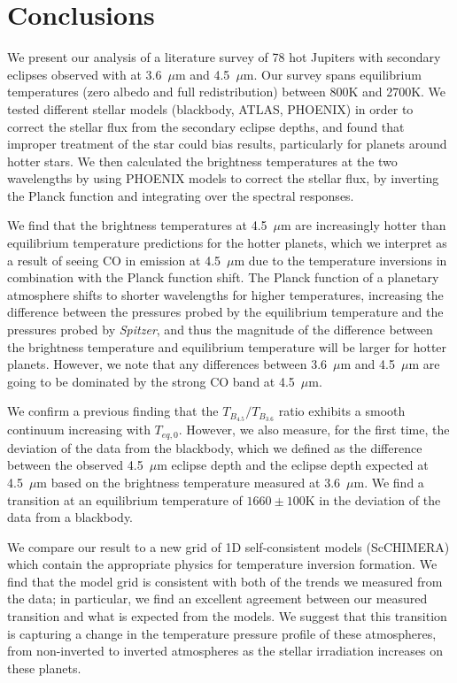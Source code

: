 
\section{Conclusions}

We present our analysis of a literature survey of 78 hot Jupiters with secondary eclipses observed with \spitzer at 3.6~$\mu$m and 4.5~$\mu$m. Our survey spans equilibrium temperatures (zero albedo and full redistribution) between 800K and 2700K. We tested different stellar models (blackbody, ATLAS, PHOENIX) in order to correct the stellar flux from the secondary eclipse depths, and found that improper treatment of the star could bias results, particularly for planets around hotter stars. We then calculated the brightness temperatures at the two \spitzer wavelengths by using PHOENIX models to correct the stellar flux, by inverting the Planck function and integrating over the \spitzer spectral responses.

We find that the brightness temperatures at 4.5~$\mu$m are increasingly hotter than equilibrium temperature predictions for the hotter planets, which we interpret as a result of seeing CO in emission at 4.5~$\mu$m due to the temperature inversions in combination with the Planck function shift. The Planck function of a planetary atmosphere shifts to shorter wavelengths for higher temperatures, increasing the difference between the pressures probed by the equilibrium temperature and the pressures probed by \textit{Spitzer}, and thus the magnitude of the difference between the brightness temperature and equilibrium temperature will be larger for hotter planets. However, we note that any differences between 3.6~$\mu$m and 4.5~$\mu$m are going to be dominated by the strong CO band at 4.5~$\mu$m.

We confirm a previous finding that the $T_{B_{4.5}}/T_{B_{3.6}}$ ratio exhibits a smooth continuum increasing with $T_{eq,\textit{0}}$.
However, we also measure, for the first time, the deviation of the data from the blackbody, which we defined as the difference between the observed 4.5~$\mu$m eclipse depth and the eclipse depth expected at 4.5~$\mu$m based on the brightness temperature measured at 3.6~$\mu$m. We find a transition at an equilibrium temperature of $1660\pm100$K in the deviation of the data from a blackbody.

We compare our result to a new grid of 1D self-consistent models (ScCHIMERA) which contain the appropriate physics for temperature inversion formation. We find that the model grid is consistent with both of the trends we measured from the data; in particular, we find an excellent agreement between our measured transition and what is expected from the models. We suggest that this transition is capturing a change in the temperature pressure profile of these atmospheres, from non-inverted to inverted atmospheres as the stellar irradiation increases on these planets.

